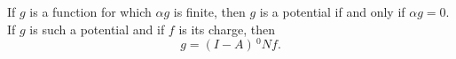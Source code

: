 If $g$ is a function for which $\alpha g$ is finite, then $g$ is a potential if and only if $\alpha g = 0$. If $g$ is such a potential and if $f$ is its charge, then
$$g = (I - A)\,^{0}\!N f.$$
